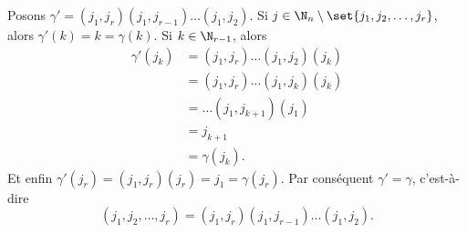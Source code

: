 Posons $\gamma' = (j_1,j_r)(j_1,j_{r-1})\dots (j_1,j_2)$.
Si $j\in\N_n\setminus\set{j_1,j_2,\dots,j_r}$, alors $\gamma'(k) = k = \gamma(k)$.
Si $k\in\N_{r-1}$, alors 
%
\begin{align*}
  \gamma'(j_k) 
    &= (j_1,j_r)\dots (j_1,j_2) (j_k) \\
    &= (j_1,j_r)\dots(j_1,j_k)(j_k) \\
    &= \dots(j_1,j_{k+1})(j_1) \\
    &= j_{k+1} \\
    &= \gamma(j_k).
\end{align*}
%
Et enfin $\gamma'(j_r) = (j_1,j_r)(j_r) = j_1 = \gamma(j_r)$.
Par conséquent $\gamma' = \gamma$, c'est-à-dire
\[
  (j_1,j_2,\dots,j_r) = (j_1,j_r)(j_1,j_{r-1})\dots (j_1,j_2).
\]
